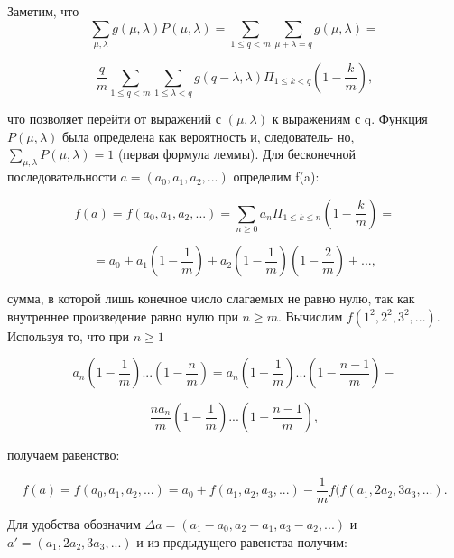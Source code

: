 \documentclass{../template/mai_book}
\begin{document}
\begin{myproof}
\indent Заметим, что \linebreak 
$$\sum_{\mu,\lambda} g(\mu, \lambda) P(\mu, \lambda) = \sum_{1 \leqslant q < m} \sum_{\mu + \lambda = q} g(\mu, \lambda) =$$ \par 
$$\frac{q}{m} \sum_{1 \leqslant q < m} \sum_{1 \leqslant \lambda < q} g(q - \lambda,\lambda) \Pi_{1 \leqslant k < q} (1 - \frac{k}{m}),$$ \par 

что позволяет перейти от выражений с $(\mu, \lambda)$ к выражениям с q. \linebreak \indent Функция $P(\mu, \lambda)$ была определена как вероятность и, следователь- \linebreak \indent но, $\sum_{\mu,\lambda} P(\mu,\lambda) = 1$ (первая формула леммы). \linebreak \indent
Для бесконечной последовательности $a = (a_{0}, a_{1}, a_{2},...)$ 
 определим \linebreak \indent f(a): \par 
 $$f(a) = f(a_{0}, a_{1}, a_{2},...) = \sum_{n \geqslant 0} a_{n} \Pi_{1 \leqslant k \leqslant n} (1 - \frac{k}{m}) = $$ \par
 
 $$= a_{0} + a_{1}(1 - \frac{1}{m}) + a_{2}(1 - \frac{1}{m})(1 - \frac{2}{m}) + ...,$$ \par 
 сумма, в которой лишь конечное число слагаемых не равно нулю, \linebreak \indent так как внутреннее произведение равно нулю при $n \geqslant m$. Вычислим \linebreak \indent $f(1^{2}, 2^{2}, 3^{2},...)$. Используя то, что при $n \geqslant 1$ \linebreak \indent \newpage
 
 
 $$a_{n}(1 - \frac{1}{m})...(1 - \frac{n}{m}) = a_{n}(1 - \frac{1}{m})...(1 - \frac{n - 1}{m}) -$$ \par
 $$\frac{na_{n}}{m}(1 - \frac{1}{m})...(1 - \frac{n - 1}{m}),$$ \par 
\noindent получаем равенство: \par 
 
 $$f(a) = f( a_{0}, a_{1}, a_{2},...) = a_{0} +  f( a_{1}, a_{2}, a_{3},...) - \frac{1}{m} f( f( a_{1}, 2a_{2}, 3a_{3},...).$$ \par 
 
\noindent Для удобства обозначим $\Delta a = (a_{1} - a_{0}, a_{2} - a_{1}, a_{3} - a_{2},...)$ и $a' = (a_{1}, 2a_{2}, 3a_{3},...)$ и из предыдущего равенства получим: \par 
 

\end{myproof}
\end{document}
